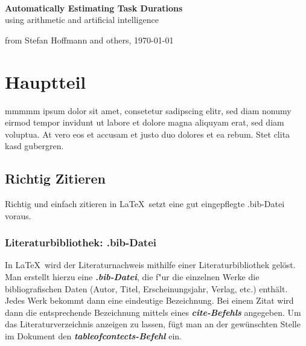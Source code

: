 \documentclass[12pt,a4paper]{article}
\begin{document}
\thispagestyle{empty}
\vspace*{-3cm}
\begin{center}
\large \textsc{}
\vspace{0.5cm}
\vspace{5.5cm}
{\large}\\
\vspace{1cm}
{\Large \bf
Automatically Estimating Task Durations}\\
\vspace*{1cm}
{\large using arithmetic and artificial intelligence}
\end{center}
\vspace*{14cm}


\hspace*{\fill} from Stefan Hoffmann and others, \today

\newpage
{}
\tableofcontents



\newpage
{}



\newpage
\section{Hauptteil}\label{body}
mmmmm ipsum dolor sit amet, consetetur sadipscing elitr, sed diam nonumy eirmod tempor invidunt ut labore et dolore magna aliquyam erat, sed diam voluptua. At vero eos et accusam et justo duo dolores et ea rebum. Stet clita kasd gubergren.

\subsection{Richtig Zitieren}
Richtig und einfach zitieren in \LaTeX\ setzt eine gut eingepflegte  .bib-Datei voraus.
\subsubsection {Literaturbibliothek: .bib-Datei }
In \LaTeX\ wird der Literaturnachweis mithilfe einer Literaturbibliothek gelöst. Man erstellt hierzu eine \textbf{\emph{.bib-Datei}}, die f"ur die einzelnen Werke die bibliografischen Daten (Autor, Titel, Erscheinungsjahr, Verlag, etc.) enthält. Jedes Werk bekommt dann eine eindeutige Bezeichnung. Bei einem Zitat wird dann die entsprechende Bezeichnung mittels eines \textbf{\emph{cite-Befehls}} angegeben. Um das Literaturverzeichnis anzeigen zu lassen, fügt man an der gewünschten Stelle im Dokument den \textbf{\emph{tableofcontects-Befehl}} ein.
\end{document}
